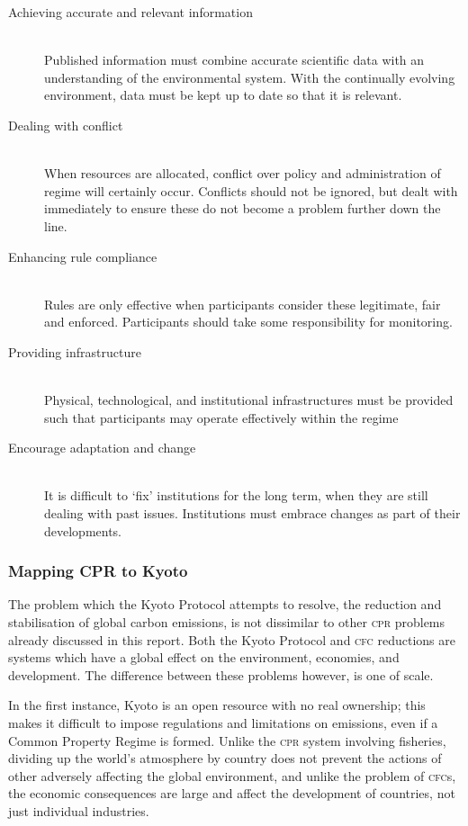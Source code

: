 \begin{description}
	\item[Achieving accurate and relevant information] \hfill \\
	Published information must combine accurate scientific data with an understanding of the environmental system. With the continually evolving environment, data must be kept up to date so that it is relevant. 
	
	\item[Dealing with conflict] \hfill \\
	When resources are allocated, conflict over policy and administration of regime will certainly occur. Conflicts should not be ignored, but dealt with immediately to ensure these do not become a problem further down the line. 

	\item[Enhancing rule compliance] \hfill \\
	Rules are only effective when participants consider these legitimate, fair and enforced. Participants should take some responsibility for monitoring.
	
	\item[Providing infrastructure] \hfill \\
	Physical, technological, and institutional infrastructures must be provided such that participants may operate effectively within the regime
	
	\item[Encourage adaptation and change] \hfill \\
	It is difficult to `fix' institutions for the long term, when they are still dealing with past issues. Institutions must embrace changes as part of their developments.
\end{description}

\subsubsection{Mapping CPR to Kyoto}

The problem which the Kyoto Protocol attempts to resolve, the reduction and stabilisation of global carbon emissions, is not dissimilar to other \textsc{cpr} problems already discussed in this report. Both the Kyoto Protocol and \textsc{cfc} reductions are  systems which have a global effect on the environment, economies, and development. The difference between these problems however, is one of scale.

In the first instance, Kyoto is an open resource with no real ownership; this makes it difficult to impose regulations and limitations on emissions, even if a Common Property Regime is formed. Unlike the \textsc{cpr} system involving fisheries, dividing up the world’s atmosphere by country does not prevent the actions of other adversely affecting the global environment, and unlike the problem of \textsc{cfc}s, the economic consequences are large and affect the development of countries, not just individual industries.

